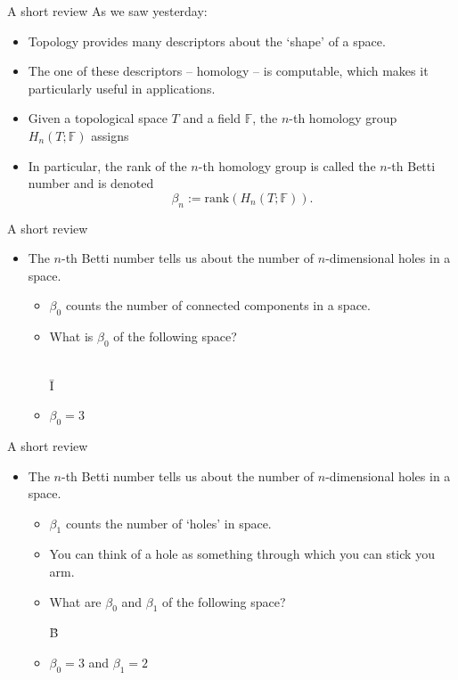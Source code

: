 \begin{frame}{A short review}
As we saw yesterday:
\begin{itemize}
\item<2-> Topology provides many descriptors about the `shape' of a space.
\item<3-> The one of these descriptors -- homology -- is computable, which makes it particularly useful in applications.
\item<4-> Given a topological space $T$ and a field $\mathbb{F}$, the $n$-th homology group $H_n(T;\mathbb{F})$ assigns 
\item<5-> In particular, the rank of the $n$-th homology group is called the $n$-th Betti number and is denoted
	\[
	\beta_n := \textrm{rank}(H_n(T;\mathbb{F})).
	\]
\end{itemize}
\end{frame}
\begin{frame}{A short review}
\begin{itemize}
\item The $n$-th Betti number tells us about the number of $n$-dimensional holes in a space.
	\begin{itemize}
	\item<2-> $\beta_0$ counts the number of connected components in a space.
	\item<3-> What is $\beta_0$ of the following space?\\
	\
	\begin{center}
	{\fontsize{50pt}{1pt}\selectfont \={I}}
	\end{center}
	\item<4-> $\beta_0 = 3$
	\end{itemize}
\end{itemize}
\end{frame}
\begin{frame}{A short review}
\begin{itemize}
\item The $n$-th Betti number tells us about the number of $n$-dimensional holes in a space.
	\begin{itemize}
	\item<1-> $\beta_1$ counts the number of `holes' in space.
	\item<2-> You can think of a hole as something through which you can stick you arm.
	\item<3-> What are $\beta_0$ and $\beta_1$ of the following space?
	\begin{center}
	{\fontsize{50pt}{12pt}\selectfont \"{B}}
	\end{center}	
	\item<4-> $\beta_0 = 3$ and $\beta_1 = 2$
	\end{itemize}
\end{itemize}
\end{frame}
